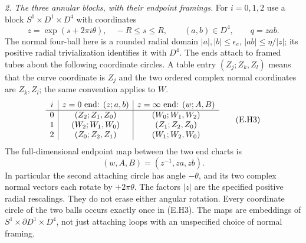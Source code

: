\emph{2. The three annular blocks, with their endpoint framings.}
For $i=0,1,2$ use a block $S^1\times D^1\times D^4$ with coordinates
\[
 z=\exp(s+2\pi i\theta),\quad -R\leq s\leq R,
 \qquad (a,b)\in D^4,\qquad q=zab.
 \tag{E.H2}
\]
The normal four-ball here is a rounded radial domain
$|a|,|b|\leq\epsilon_e$, $|ab|\leq\eta/|z|$;
its positive radial trivialization identifies it with $D^4$.
The ends attach to framed tubes about the following coordinate
circles.  A table entry $(Z_j;Z_k,Z_l)$ means that the curve
coordinate is $Z_j$ and the two ordered complex normal coordinates
are $Z_k,Z_l$; the same convention applies to $W$.
\[
\begin{array}{c|c|c}
 i&z=0\hbox{ end: }(z;a,b)&z=\infty\hbox{ end: }(w;A,B)\\ \hline
0&(Z_2;Z_1,Z_0)&(W_0;W_1,W_2)\\
1&(W_2;W_1,W_0)&(Z_1;Z_2,Z_0)\\
2&(Z_0;Z_2,Z_1)&(W_1;W_2,W_0)
\end{array}
\tag{E.H3}
\]
The full-dimensional endpoint map between the two end charts is
\[
                 (w,A,B)=(z^{-1},za,zb).
 \tag{E.H4}
\]
In particular the second attaching circle has angle $-\theta$,
and its two complex normal vectors each rotate by $+2\pi\theta$.
The factors $|z|$ are the specified positive radial rescalings.
They do not erase either angular rotation.  Every coordinate circle
of the two balls occurs exactly once in (E.H3).  The maps are
embeddings of $S^1\times\partial D^1\times D^4$, not just attaching
loops with an unspecified choice of normal framing.

